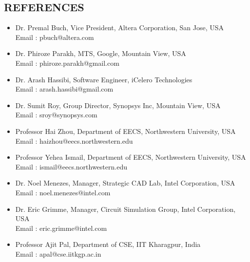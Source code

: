 \documentclass[margin]{res}
\begin{document}
\begin{resume}
\section{REFERENCES}
\begin{itemize} \itemsep -2pt
\item Dr. Premal Buch, Vice President, Altera Corporation, San Jose, USA\\
  Email : pbuch@altera.com
\item Dr. Phiroze Parakh, MTS, Google, Mountain View, USA\\
  Email : phiroze.parakh@gmail.com
\item Dr. Arash Hassibi, Software Engineer, iCelero Technologies\\
  Email : arash.hassibi@gmail.com
\item Dr. Sumit Roy, Group Director, Synopsys Inc, Mountain View, USA\\
  Email : sroy@synopsys.com
\item Professor Hai Zhou, Department of EECS, Northwestern University, USA\\
  Email : haizhou@eecs.northwestern.edu
\item Professor Yehea Ismail, Department of EECS, Northwestern University, USA\\
  Email : ismail@eecs.northwestern.edu
\item Dr. Noel Menezes, Manager, Strategic CAD Lab, Intel Corporation, USA\\
  Email : noel.menezes@intel.com
\item Dr. Eric Grimme, Manager, Circuit Simulation Group, Intel Corporation, USA\\
  Email : eric.grimme@intel.com
\item Professor Ajit Pal, Department of CSE, IIT Kharagpur, India\\
  Email : apal@cse.iitkgp.ac.in
\end{itemize}

\end{resume}
\end{document}
